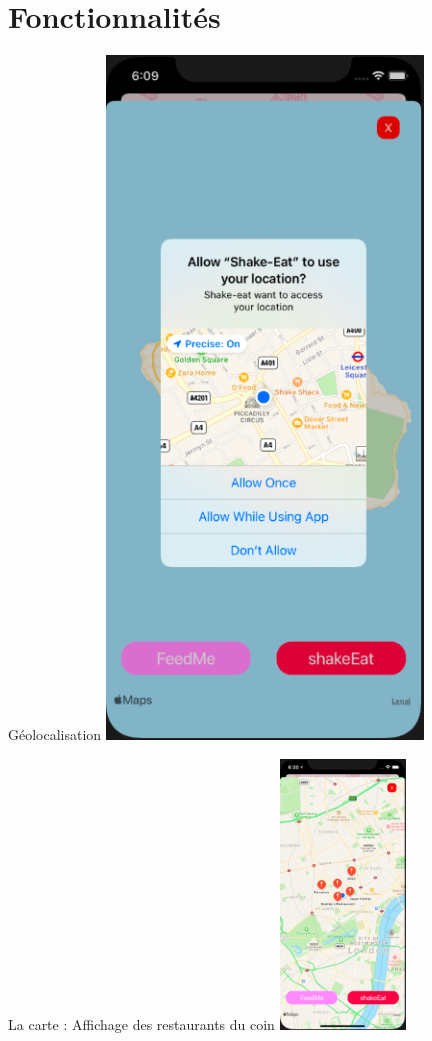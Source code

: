\section{Fonctionnalités} 


    
    \frame{\sectionpage}
    
   
    \begin{frame}{Géolocalisation}
        \centering
        \includegraphics[height = 0.8 \textheight]{images/geoloc.png}
        
    \end{frame}
    
     \begin{frame}{La carte : Affichage des restaurants du coin}
        \centering
        \includegraphics[width = 0.25\textwidth]{images/carte-tous-restos.png}
    \end{frame}
    
